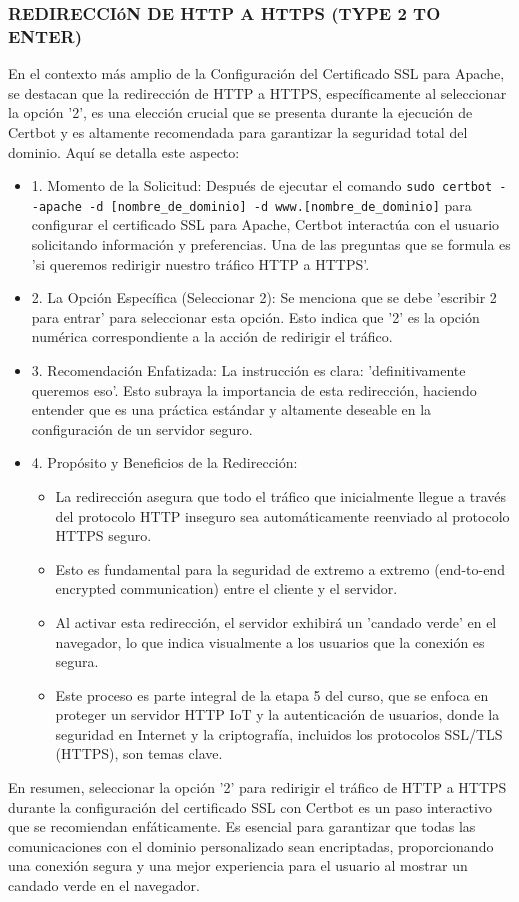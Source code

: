 \documentclass{report}
\begin{document}
\subsubsection{REDIRECCIóN DE HTTP A HTTPS (TYPE 2 TO ENTER)}
En el contexto más amplio de la Configuración del Certificado SSL para Apache, se  destacan que la redirección de HTTP a HTTPS, 
específicamente al seleccionar la opción '2', es una elección crucial que se presenta durante la ejecución de Certbot y es altamente 
recomendada para garantizar la seguridad total del dominio.
Aquí se detalla este aspecto:
\begin{itemize}
    \item 1. Momento de la Solicitud: Después de ejecutar el comando \verb|sudo certbot --apache -d [nombre_de_dominio] -d www.[nombre_de_dominio]| 
    para configurar el certificado SSL para Apache, Certbot interactúa con el usuario solicitando información y preferencias. Una de las 
    preguntas que se formula es 'si queremos redirigir nuestro tráfico HTTP a HTTPS'.
    \item 2. La Opción Específica (Seleccionar 2): Se menciona que se debe 'escribir 2 para entrar' para seleccionar esta opción. 
    Esto indica que '2' es la opción numérica correspondiente a la acción de redirigir el tráfico.
    \item 3. Recomendación Enfatizada: La instrucción es clara: 'definitivamente queremos eso'. Esto subraya la importancia de esta 
    redirección, haciendo entender que es una práctica estándar y altamente deseable en la configuración de un servidor seguro.
    \item 4. Propósito y Beneficios de la Redirección:
        \begin{itemize}
            \item La redirección asegura que todo el tráfico que inicialmente llegue a través del protocolo HTTP inseguro sea automáticamente 
            reenviado al protocolo HTTPS seguro.
            \item Esto es fundamental para la seguridad de extremo a extremo (end-to-end encrypted communication) entre el cliente y el servidor.
            \item Al activar esta redirección, el servidor exhibirá un 'candado verde' en el navegador, lo que indica visualmente a los 
            usuarios que la conexión es segura.
            \item Este proceso es parte integral de la etapa 5 del curso, que se enfoca en proteger un servidor HTTP IoT y la autenticación 
            de usuarios, donde la seguridad en Internet y la criptografía, incluidos los protocolos SSL/TLS (HTTPS), son temas clave.
        \end{itemize}
\end{itemize}
En resumen, seleccionar la opción '2' para redirigir el tráfico de HTTP a HTTPS durante la configuración del certificado SSL con Certbot 
es un paso interactivo que se  recomiendan enfáticamente. Es esencial para garantizar que todas las comunicaciones con el dominio 
personalizado sean encriptadas, proporcionando una conexión segura y una mejor experiencia para el usuario al mostrar 
un candado verde en el navegador.
\end{document}

